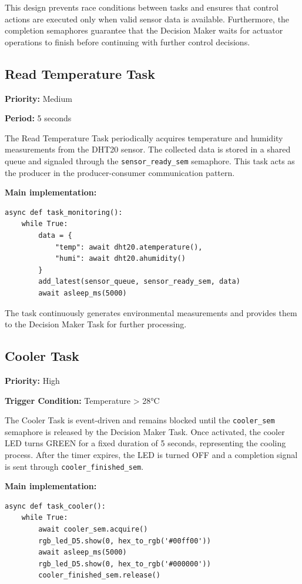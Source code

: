 This design prevents race conditions between tasks and ensures that control actions are executed only when valid sensor
data is available. Furthermore, the completion semaphores guarantee that the Decision Maker waits for actuator
operations to finish before continuing with further control decisions.

\subsection{Read Temperature Task}

\textbf{Priority:} Medium

\textbf{Period:} 5 seconds

The Read Temperature Task periodically acquires temperature and humidity measurements from the DHT20 sensor. The
collected data is stored in a shared queue and signaled through the \texttt{sensor\_ready\_sem} semaphore. This task
acts as the producer in the producer-consumer communication pattern.

\textbf{Main implementation:}

\begin{lstlisting}
async def task_monitoring():
    while True:
        data = {
            "temp": await dht20.atemperature(),
            "humi": await dht20.ahumidity()
        }
        add_latest(sensor_queue, sensor_ready_sem, data)
        await asleep_ms(5000)
\end{lstlisting}

The task continuously generates environmental measurements and provides them to the Decision Maker Task for further
processing.

\subsection{Cooler Task}

\textbf{Priority:} High

\textbf{Trigger Condition:} Temperature \textgreater{} 28°C

The Cooler Task is event-driven and remains blocked until the \texttt{cooler\_sem} semaphore is released by the
Decision Maker Task. Once activated, the cooler LED turns GREEN for a fixed duration of 5 seconds, representing the
cooling process. After the timer expires, the LED is turned OFF and a completion signal is sent through
\texttt{cooler\_finished\_sem}.

\textbf{Main implementation:}

\begin{lstlisting}
async def task_cooler():
    while True:
        await cooler_sem.acquire()
        rgb_led_D5.show(0, hex_to_rgb('#00ff00'))
        await asleep_ms(5000)
        rgb_led_D5.show(0, hex_to_rgb('#000000'))
        cooler_finished_sem.release()
\end{lstlisting}

